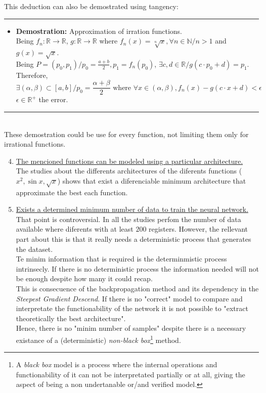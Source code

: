 \documentclass[a4paper, 11pt]{article}
\begin{document}
\begin{enumerate}
    This deduction can also be demostrated using tangency:\\
    \rule{\linewidth}{0.4pt}
    \begin{itemize}
        \item \textbf{Demostration:} Approximation of irration functions.\\
        Being $f_n:\mathbb{R}\rightarrow\mathbb{R}$, $g:\mathbb{R}\rightarrow\mathbb{R}$ where $f_n(x) = \sqrt[n]{x}, \forall n \in \mathbb{N} / n > 1$ and $g(x) = \sqrt{x}$.\\
        Being $P=(p_0, p_1) / p_0 = \frac{a+b}{2}, p_1 = f_n(p_0)$, $\exists c,d\in\mathbb{R} / g(c\cdot p_0 + d) = p_1$.
        Therefore, 
        $$\exists (\alpha, \beta) \subset [a,b] / p_0 = \frac{\alpha + \beta}{2} \text{ where } \forall x \in (\alpha, \beta), f_n(x) - g(c\cdot x + d) < \epsilon$$
        $\epsilon\in\mathbb{R^+}$ the error.
    \end{itemize}
    \rule{\linewidth}{0.4pt}\\
    These demostration could be use for every function, not limiting them only for irrational functions.
\end{enumerate}
\begin{enumerate}
    \setcounter{enumi}{3}
    \item \underline{The mencioned functions can be modeled using a particular architecture.}\\
    The studies about the differents architectures of the diferents functions ($x^2, \sin{x}, \sqrt{x}$) shows that exist a diferenciable minimum architecture that approximate the best each function.\\
    \item \underline{Exists a determined minimum number of data to train the neural network.}\\
    That point is controversial. In all the studies perfom the number of data available where diferents  with at least $200$ registers. However, the rellevant part about this is that it really needs a deterministic process that generates the dataset.\\
    Te minim information that is required is the determinmistic process intrinsecly. If there is no deterministic process the information needed will not be enough despite how many it could recap.\\
    This is consecuence of the backpropagation method and its dependency in the \textit{Steepest Gradient Descend}. If there is no "correct" model to compare and interpretate the functionability of the network it is not possible to "extract theoretically the best architecture".\\
    Hence, there is no "minim number of samples" despite there is a necessary existance of a (deterministic) \textit{non-black box}\footnote{A \textit{black box} model is a process where the internal operations and functionability of it can not be interpretated partially or at all, giving the aspect of being a non undertanable or/and verified model.} method.
\end{enumerate}
\end{document}
